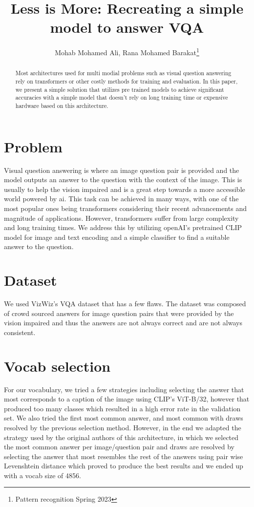 \documentclass[12pt]{IEEEtran}
\begin{document}
\title{Less is More: Recreating a simple model to answer VQA}
\author{Mohab Mohamed Ali, Rana Mohamed Barakat\thanks{Pattern recognition Spring 2023}}
\maketitle

\begin{abstract}
Most architectures used for multi modial problems such as visual question answering rely on transformers or other costly methods for training and evaluation. In this paper, we present a simple solution that utilizes pre trained models to achieve significant accuracies with a simple model that doesn’t rely on long training time or expensive hardware based on this architecture\cite{deuser2022less}.
\end{abstract}

\section{Problem}
Visual question answering is where an image question pair is provided and the model outputs an answer to the question with the context of the image. This is usually to help the vision impaired and is a great step towards a more accessible world powered by ai. This task can be achieved in many ways, with one of the most popular ones being transformers considering their recent advancements and magnitude of applications. However, transformers suffer from large complexity and long training times. We address this by utilizing openAI’s pretrained CLIP\cite{radford2021learning} model for image and text encoding and a simple classifier to find a suitable answer to the question.

\section{Dataset}
We used VizWiz’s VQA dataset that has a few flaws. The dataset was composed of crowd sourced answers for image question pairs that were provided by the vision impaired and thus the answers are not always correct and are not always consistent. 

\section{Vocab selection}
For our vocabulary, we tried a few strategies including selecting the answer that most corresponds to a caption of the image using CLIP’s ViT-B/32, however that produced too many classes which resulted in a high error rate in the validation set. We also tried the first most common answer, and most common with draws resolved by the previous selection method. However, in the end we adapted the strategy used by the original authors of this architecture, in which we selected the most common answer per image/question pair and draws are resolved by selecting the answer that most resembles the rest of the answers using pair wise Levenshtein distance which proved to produce the best results and we ended up with a vocab size of 4856.
\end{document}
